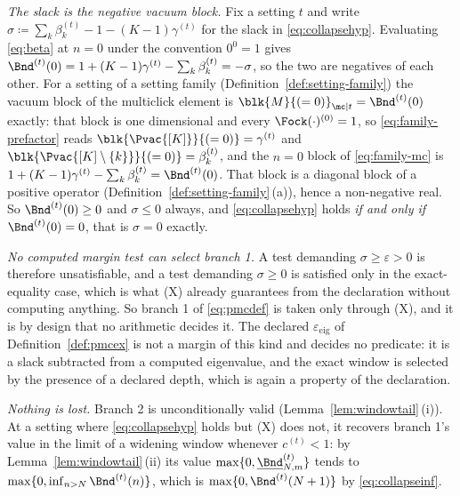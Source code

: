 
\begin{remark}\label{rem:noslack}
\emph{The slack is the negative vacuum block.} Fix a setting $t$ and write
$\sigma\coloneqq\sum_k\beta^{(t)}_k-1-(K-1)\gamma^{(t)}$ for the slack in
\eqref{eq:collapsehyp}. Evaluating \eqref{eq:beta} at $n=0$ under the
convention $0^0=1$ gives
$\Bnd^{(t)}(0)=1+(K-1)\gamma^{(t)}-\sum_k\beta^{(t)}_k=-\sigma$, so the two are
negatives of each other. For a setting of a setting family
(Definition~\ref{def:setting-family}) the vacuum block of the multiclick
element is $\blk{M}{(=0)}_{\mc|t}=\Bnd^{(t)}(0)$ exactly: that block is one
dimensional and every $\Fock(\cdot)^{(0)}=1$, so \eqref{eq:family-prefactor}
reads $\blk{\Pvac{[K]}}{(=0)}=\gamma^{(t)}$ and
$\blk{\Pvac{[K]\setminus\{k\}}}{(=0)}=\beta^{(t)}_k$, and the $n=0$ block of
\eqref{eq:family-mc} is
$1+(K-1)\gamma^{(t)}-\sum_k\beta^{(t)}_k=\Bnd^{(t)}(0)$. That
block is a diagonal block of a positive operator
(Definition~\ref{def:setting-family}\,(a)), hence a non-negative real. So
$\Bnd^{(t)}(0)\ge0$ and $\sigma\le0$ always, and \eqref{eq:collapsehyp} holds
\emph{if and only if} $\Bnd^{(t)}(0)=0$, that is $\sigma=0$ exactly.

\emph{No computed margin test can select branch 1.} A test demanding
$\sigma\ge\varepsilon>0$ is therefore unsatisfiable, and a test demanding
$\sigma\ge0$ is satisfied only in the exact-equality case, which is what (X)
already guarantees from the declaration without computing anything. So
branch 1 of \eqref{eq:pmcdef} is taken only through (X), and it is by design
that no arithmetic decides it. The declared $\varepsilon_{\mathrm{eig}}$ of
Definition~\ref{def:pmcex} is not a margin of this kind and decides no
predicate: it is a slack subtracted from a computed eigenvalue, and the exact
window is selected by the presence of a declared depth, which is again a
property of the declaration.

\emph{Nothing is lost.} Branch 2 is unconditionally valid
(Lemma~\ref{lem:windowtail}\,(i)). At a setting where \eqref{eq:collapsehyp}
holds but (X) does not, it recovers branch 1's value in the limit of a
widening window whenever $c^{(t)}<1$: by Lemma~\ref{lem:windowtail}\,(ii) its
value $\max\{0,\underline{\Bnd}^{(t)}_{N,m}\}$ tends to
$\max\{0,\inf_{n>N}\Bnd^{(t)}(n)\}$, which is $\max\{0,\Bnd^{(t)}(N+1)\}$ by
\eqref{eq:collapseinf}.
\end{remark}
